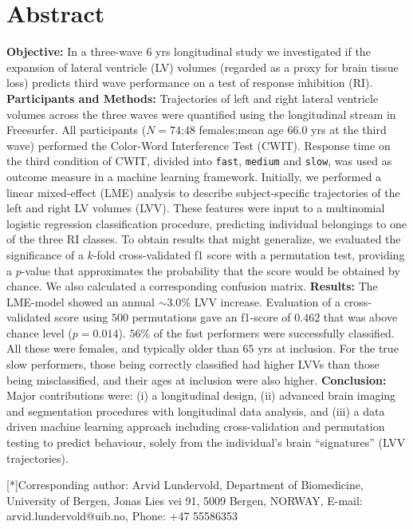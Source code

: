 \documentclass[10pt,letterpaper]{article}
\begin{document}
\section*{Abstract}

\vspace{-1mm}

{\bf Objective:} In a three-wave 6 yrs longitudinal study we investigated if the expansion of lateral ventricle (LV) volumes (regarded as a proxy for brain tissue loss) predicts third wave performance on a test of response inhibition (RI).
{\bf Participants and Methods:}  Trajectories
of left and right lateral ventricle volumes across the three waves were quantified using the longitudinal stream in Freesurfer. All participants ($N=74$;$48$ females;mean age $66.0$ yrs at the third wave) performed the Color-Word Interference Test (CWIT). Response time on the third condition of CWIT, divided into {\tt fast}, {\tt medium} and {\tt slow}, was used as outcome measure in a machine learning framework. Initially, we performed a linear mixed-effect (LME) analysis to describe subject-specific trajectories of the left and right LV volumes (LVV). These features were input to a multinomial logistic regression classification procedure, predicting individual belongings to one of the three RI classes. To obtain results that might generalize, we evaluated the significance of a $k$-fold cross-validated f1 score with a permutation test, providing a $p$-value that approximates the probability that the score would be obtained by chance. We also calculated a corresponding confusion matrix.
{\bf Results:} The LME-model showed an annual $\sim3.0$\% LVV increase. Evaluation of a cross-validated score using $500$ permutations gave an f1-score of $0.462$ that was above chance level ($p=0.014$). $56$\% of the fast performers were successfully classified. All these were females, and typically older than $65$ yrs at inclusion. For the true slow performers, those being correctly classified had higher LVVs than those being misclassified, and their ages at inclusion were also higher.
{\bf Conclusion:} Major contributions
were: (i) a longitudinal design, (ii) advanced brain imaging and segmentation procedures with longitudinal data analysis, and (iii) a data driven machine learning approach including cross-validation and permutation testing to predict behaviour, solely from the individual's brain ``signatures” (LVV trajectories).


\vspace{3mm}

[*]{Corresponding author: Arvid Lundervold, Department of Biomedicine, University of Bergen, Jonas Lies vei 91, 5009 Bergen, NORWAY,  E-mail: arvid.lundervold@uib.no, Phone: +47 55586353}
\end{document}
